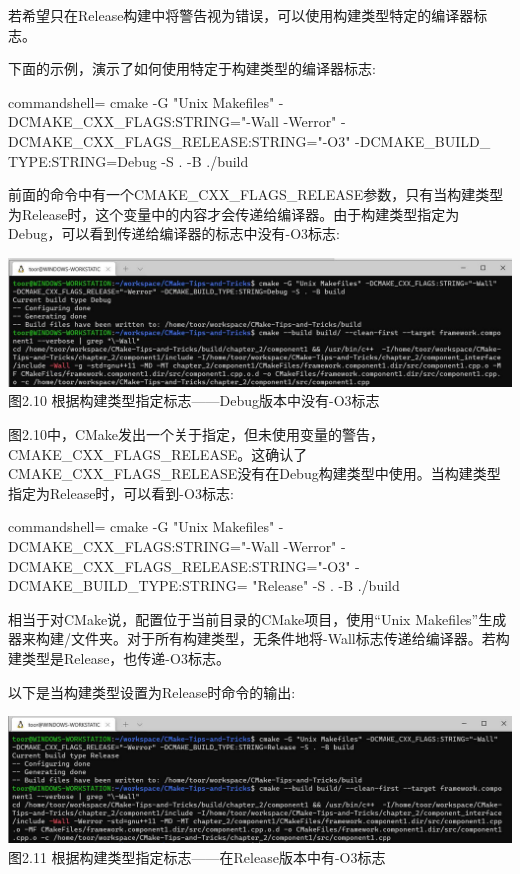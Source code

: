 若希望只在Release构建中将警告视为错误，可以使用构建类型特定的编译器标志。

下面的示例，演示了如何使用特定于构建类型的编译器标志:

\begin{tcblisting}{commandshell={}}
cmake -G "Unix Makefiles" -DCMAKE_CXX_FLAGS:STRING="-Wall
  -Werror" -DCMAKE_CXX_FLAGS_RELEASE:STRING="-O3" -DCMAKE_BUILD_
  TYPE:STRING=Debug -S . -B ./build
\end{tcblisting}

前面的命令中有一个CMAKE\_CXX\_FLAGS\_RELEASE参数，只有当构建类型为Release时，这个变量中的内容才会传递给编译器。由于构建类型指定为Debug，可以看到传递给编译器的标志中没有-O3标志:

\begin{center}
\includegraphics[width=1.\textwidth]{content/1/chapter2/images/10.jpg}\\
图2.10 根据构建类型指定标志——Debug版本中没有-O3标志
\end{center}

图2.10中，CMake发出一个关于指定，但未使用变量的警告，CMAKE\_CXX\_FLAGS\_RELEASE。这确认了CMAKE\_CXX\_FLAGS\_RELEASE没有在Debug构建类型中使用。当构建类型指定为Release时，可以看到-O3标志:

\begin{tcblisting}{commandshell={}}
cmake -G "Unix Makefiles" -DCMAKE_CXX_FLAGS:STRING="-Wall
-Werror" -DCMAKE_CXX_FLAGS_RELEASE:STRING="-O3"
-DCMAKE_BUILD_TYPE:STRING= "Release" -S . -B ./build
\end{tcblisting}

相当于对CMake说，配置位于当前目录的CMake项目，使用“Unix Makefiles”生成器来构建/文件夹。对于所有构建类型，无条件地将-Wall标志传递给编译器。若构建类型是Release，也传递-O3标志。

以下是当构建类型设置为Release时命令的输出:

\begin{center}
\includegraphics[width=1.\textwidth]{content/1/chapter2/images/11.jpg}\\
图2.11 根据构建类型指定标志——在Release版本中有-O3标志
\end{center}

